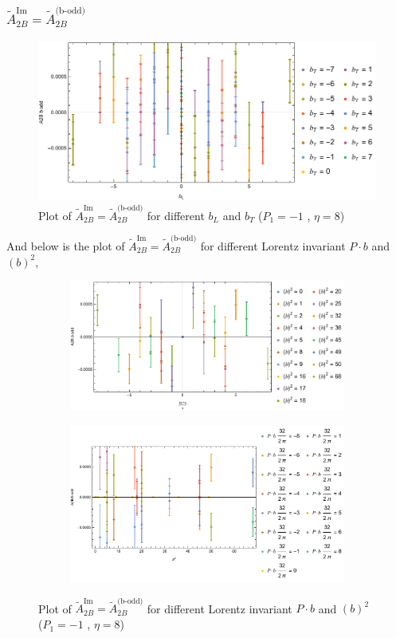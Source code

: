 \documentclass[]{article}
\numberwithin{equation}{section}
\newcommand{\tAmp}{\widetilde{A}}
\newcommand{\tAmp}{\ensuremath{\widetilde{A}^{(+)}}}
\begin{document}
\subsubsection{$\tAmp^{\text{Im}}_{2B}=\tAmp^{\text{(b-odd)}}_{2B}$}
\begin{figure}[h!]
    \centering
    \includegraphics[width=0.45\linewidth]{bLbT_A2B_b_odd_P1_-1_eta_8.pdf}
    \caption{Plot of  $\tAmp^{\text{Im}}_{2B}=\tAmp^{\text{(b-odd)}}_{2B}$ for different $b_{L}$ and $b_{T}$  ($P_{1} = -1$ , $\eta=8$)}
\end{figure}

And below is the plot of $\tAmp^{\text{Im}}_{2B}=\tAmp^{\text{(b-odd)}}_{2B}$ for different Lorentz invariant $P\cdot b$ and $(b)^2$,
\begin{figure}[h!]
     \centering
     \begin{subfigure}[b]{0.45\textwidth}
         \centering
         \includegraphics[width=\textwidth]{bP_A2B_b_odd_P1_-1_eta_8.pdf}
     \end{subfigure}
     \begin{subfigure}[b]{0.45\textwidth}
         \centering
         \includegraphics[width=\textwidth]{bsq_A2B_b_odd_P1_-1_eta_8.pdf}
     \end{subfigure}
        \caption{Plot of $\tAmp^{\text{Im}}_{2B}=\tAmp^{\text{(b-odd)}}_{2B}$ for different Lorentz invariant $P\cdot b$ and $(b)^2$  ($P_{1} = -1$ , $\eta=8$)}
\end{figure}
\end{document}
